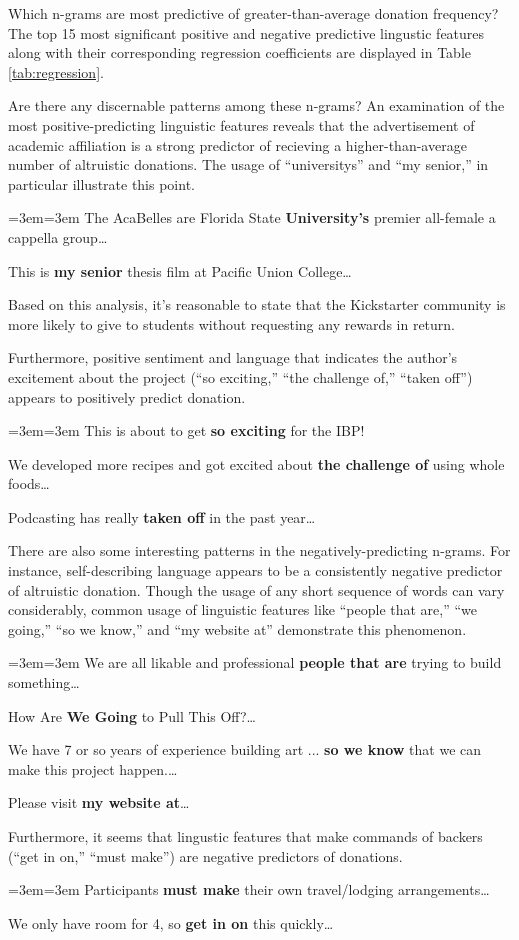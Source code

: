 \documentclass[letterpaper]{article}
\newenvironment{blockquote}{%
  \par%
  \setlength{\parskip}{.5em}
  \small
  \medskip
  \leftskip=3em\rightskip=3em%
  \noindent\ignorespaces}{%
  \par\medskip}
\begin{document}
Which n-grams are most predictive of greater-than-average donation frequency? The top 15 most significant positive and negative predictive lingustic features along with their corresponding regression coefficients are displayed in Table \ref{tab:regression}.

Are there any discernable patterns among these n-grams? An examination of the most positive-predicting linguistic features reveals that the advertisement of academic affiliation is a strong predictor of recieving a higher-than-average number of altruistic donations. The usage of ``universitys'' and ``my senior,'' in particular illustrate this point.
\begin{blockquote}
The AcaBelles are Florida State \textbf{University's} premier all-female a cappella group\ldots\par\noindent
This is \textbf{my senior} thesis film at Pacific Union College\ldots\par\noindent
\end{blockquote}
Based on this analysis, it's reasonable to state that the Kickstarter community is more likely to give to students without requesting any rewards in return.

Furthermore, positive sentiment and language that indicates the author's excitement about the project (``so exciting,'' ``the challenge of,'' ``taken off'') appears to positively predict donation.
\begin{blockquote}
This is about to get \textbf{so exciting} for the IBP! \par\noindent
We developed more recipes and got excited about \textbf{the challenge of} using whole foods\ldots\par\noindent
Podcasting has really \textbf{taken off} in the past year\ldots
\end{blockquote}

There are also some interesting patterns in the negatively-predicting n-grams. For instance, self-describing language appears to be a consistently negative predictor of altruistic donation. Though the usage of any short sequence of words can vary considerably, common usage of linguistic features like ``people that are,'' ``we going,'' ``so we know,'' and ``my website at'' demonstrate this phenomenon.
\begin{blockquote}
We are all likable and professional \textbf{people that are} trying to build something\ldots\par\noindent
How Are \textbf{We Going} to Pull This Off?\ldots\par\noindent
We have 7 or so years of experience building art ... \textbf{so we know} that we can make this project happen.\ldots\par\noindent
Please visit \textbf{my website at}\ldots
\end{blockquote}
Furthermore, it seems that lingustic features that make commands of backers (``get in on,'' ``must make'') are negative predictors of donations.
\begin{blockquote}
Participants \textbf{must make} their own travel/lodging arrangements\ldots\par\noindent
We only have room for 4, so \textbf{get in on} this quickly\ldots
\end{blockquote}
\end{document}
